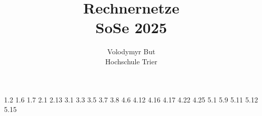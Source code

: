 \documentclass[10pt, oneside]{article}
\title{Rechnernetze\\[10pt]\Large{SoSe 2025}}
\author{Volodymyr But\\[10pt]Hochschule Trier}
\date{}
\begin{document}
\maketitle
\vspace{25px}

{1.2}
{1.6}
{1.7}
{2.1}
{2.13}
{3.1}
\pagebreak
{3.3}
{3.5}
\pagebreak
{3.7}
{3.8}
{4.6}
{4.12}
{4.16}
{4.17}
{4.22}
{4.25}
\setcounter{figure}{0}
{5.1}
{5.9}
{5.11}
{5.12}
{5.15}
\end{document}
